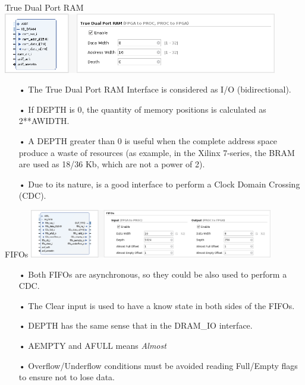 \documentclass[aspectratio=169]{beamer}
\begin{document}
\begin{frame}{True Dual Port RAM}
  \center
  \includegraphics[width=0.9\textwidth]{../vivado/guide/only-dram.png}
  \begin{itemize}
    \item[•] The True Dual Port RAM Interface is considered as I/O (bidirectional).
    \item[•] If DEPTH is 0, the quantity of memory positions is calculated as 2**AWIDTH.
    \item[•] A DEPTH greater than 0 is useful when the complete address space produce a waste of resources (as example, in the Xilinx 7-series, the BRAM are used as 18/36 Kb, which are not a power of 2).
    \item[•] Due to its nature, is a good interface to perform a Clock Domain Crossing (CDC).
  \end{itemize}
\end{frame}

\begin{frame}{FIFOs}
  \center
  \includegraphics[width=0.8\textwidth]{../vivado/guide/only-fifos.png}
  \begin{itemize}
    \item[•] Both FIFOs are asynchronous, so they could be also used to perform a CDC.
    \item[•] The Clear input is used to have a know state in both sides of the FIFOs.
    \item[•] DEPTH has the same sense that in the DRAM\_IO interface.
    \item[•] AEMPTY and AFULL means \textit{Almost}
    \item[•] Overflow/Underflow conditions must be avoided reading Full/Empty flags to ensure not to lose data.
  \end{itemize}
\end{frame}

\end{document}
